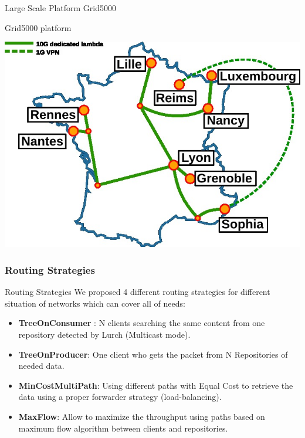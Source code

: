 \documentclass[8pt]{beamer}
\newcommand{\1}{\mathbbm 1}
\begin{document}
\begin{frame}{Large Scale Platform Grid5000}

Grid5000 platform

\begin{center}
\includegraphics[scale=0.48]{figures/grid.jpg}
\end{center}

\end{frame}

\subsubsection{Routing Strategies}
\begin{frame}{Routing Strategies}
We proposed 4 different routing strategies for different situation of networks which can cover all of needs:
\begin{itemize}

\item \textbf{TreeOnConsumer} : N clients searching the same content from one repository detected by Lurch (Multicast mode).

\item \textbf{TreeOnProducer}: One client who gets the packet from N Repositories of needed data.

\item \textbf{MinCostMultiPath}: Using different paths with Equal Cost to retrieve the data using a proper forwarder strategy (load-balancing).

\item \textbf{MaxFlow}: Allow to maximize the throughput using paths based on maximum flow algorithm between clients and repositories.

\end{itemize}
\end{frame}
\end{document}

